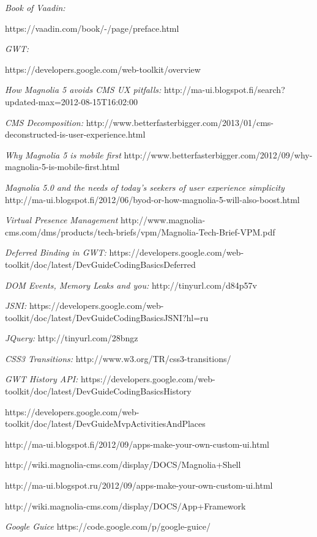 \begin{thebibliography}{9}
  \emph{Book of Vaadin:}
  
  https://vaadin.com/book/-/page/preface.html
  
  \emph{GWT:}
  
  https://developers.google.com/web-toolkit/overview
  
 \emph{How Magnolia 5 avoids CMS UX pitfalls:}
 http://ma-ui.blogspot.fi/search?updated-max=2012-08-15T16:02:00%
 
 \emph{CMS Decomposition:}
 http://www.betterfasterbigger.com/2013/01/cms-deconstructed-is-user-experience.html
 
 \emph{Why Magnolia 5 is mobile first}
 http://www.betterfasterbigger.com/2012/09/why-magnolia-5-is-mobile-first.html
 
 \emph{Magnolia 5.0 and the needs of today's seekers of user experience simplicity}
 http://ma-ui.blogspot.fi/2012/06/byod-or-how-magnolia-5-will-also-boost.html
 
 \emph{Virtual Presence Management}
 http://www.magnolia-cms.com/dms/products/tech-briefs/vpm/Magnolia-Tech-Brief-VPM.pdf
 
 \emph{Deferred Binding in GWT:}
 https://developers.google.com/web-toolkit/doc/latest/DevGuideCodingBasicsDeferred

 \emph{DOM Events, Memory Leaks and you:} 
 http://tinyurl.com/d84p57v 
  
\emph{JSNI:}
https://developers.google.com/web-toolkit/doc/latest/DevGuideCodingBasicsJSNI?hl=ru

\emph{JQuery:}
http://tinyurl.com/28bngz

\emph{CSS3 Transitions:}
http://www.w3.org/TR/css3-transitions/

\emph{GWT History API:}
https://developers.google.com/web-toolkit/doc/latest/DevGuideCodingBasicsHistory

https://developers.google.com/web-toolkit/doc/latest/DevGuideMvpActivitiesAndPlaces

http://ma-ui.blogspot.fi/2012/09/apps-make-your-own-custom-ui.html

http://wiki.magnolia-cms.com/display/DOCS/Magnolia+Shell

http://ma-ui.blogspot.ru/2012/09/apps-make-your-own-custom-ui.html

http://wiki.magnolia-cms.com/display/DOCS/App+Framework

\emph{Google Guice}
https://code.google.com/p/google-guice/
\end{thebibliography}